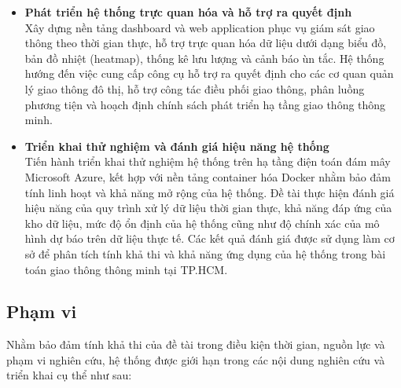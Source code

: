 \begin{itemize}
    \item \textbf{Phát triển hệ thống trực quan hóa và hỗ trợ ra quyết định}\\
    Xây dựng nền tảng dashboard và web application phục vụ giám sát giao thông theo thời gian thực, hỗ trợ trực quan hóa dữ liệu dưới dạng biểu đồ, bản đồ nhiệt (heatmap), thống kê lưu lượng và cảnh báo ùn tắc. Hệ thống hướng đến việc cung cấp công cụ hỗ trợ ra quyết định cho các cơ quan quản lý giao thông đô thị, hỗ trợ công tác điều phối giao thông, phân luồng phương tiện và hoạch định chính sách phát triển hạ tầng giao thông thông minh.

    \item \textbf{Triển khai thử nghiệm và đánh giá hiệu năng hệ thống}\\
    Tiến hành triển khai thử nghiệm hệ thống trên hạ tầng điện toán đám mây Microsoft Azure, kết hợp với nền tảng container hóa Docker nhằm bảo đảm tính linh hoạt và khả năng mở rộng của hệ thống. Đề tài thực hiện đánh giá hiệu năng của quy trình xử lý dữ liệu thời gian thực, khả năng đáp ứng của kho dữ liệu, mức độ ổn định của hệ thống cũng như độ chính xác của mô hình dự báo trên dữ liệu thực tế. Các kết quả đánh giá được sử dụng làm cơ sở để phân tích tính khả thi và khả năng ứng dụng của hệ thống trong bài toán giao thông thông minh tại TP.HCM.

\end{itemize}

\subsection{Phạm vi}

Nhằm bảo đảm tính khả thi của đề tài trong điều kiện thời gian, nguồn lực và phạm vi nghiên cứu, hệ thống được giới hạn trong các nội dung nghiên cứu và triển khai cụ thể như sau:

